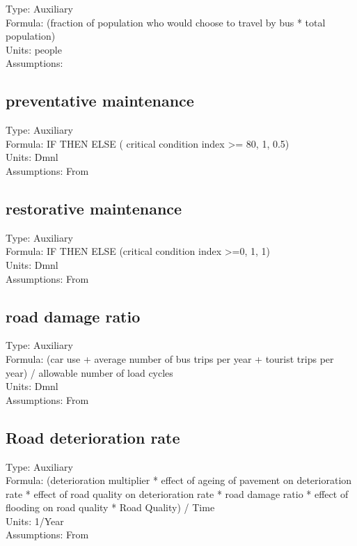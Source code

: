 \documentclass[
  11pt,
]{book}
\begin{document}
Type: Auxiliary\\
Formula: (fraction of population who would choose to travel by bus * total population)\\
Units: people\\
Assumptions:

\hypertarget{preventative-maintenance}{%
\subsection{preventative maintenance}\label{preventative-maintenance}}

Type: Auxiliary\\
Formula: IF THEN ELSE ( critical condition index \textgreater= 80, 1, 0.5)\\
Units: Dmnl\\
Assumptions: From \citet{fallah-fini_measuring_2015}

\hypertarget{restorative-maintenance}{%
\subsection{restorative maintenance}\label{restorative-maintenance}}

Type: Auxiliary\\
Formula: IF THEN ELSE (critical condition index \textgreater=0, 1, 1)\\
Units: Dmnl\\
Assumptions: From \citet{fallah-fini_measuring_2015}

\hypertarget{road-damage-ratio}{%
\subsection{road damage ratio}\label{road-damage-ratio}}

Type: Auxiliary\\
Formula: (car use + average number of bus trips per year + tourist trips per year) / allowable number of load cycles\\
Units: Dmnl\\
Assumptions: From \citet{fallah-fini_measuring_2015}

\hypertarget{road-deterioration-rate}{%
\subsection{Road deterioration rate}\label{road-deterioration-rate}}

Type: Auxiliary\\
Formula: (deterioration multiplier * effect of ageing of pavement on deterioration rate * effect of road quality on deterioration rate * road damage ratio * effect of flooding on road quality * Road Quality) / Time\\
Units: 1/Year\\
Assumptions: From \citet{fallah-fini_measuring_2015}
\end{document}
